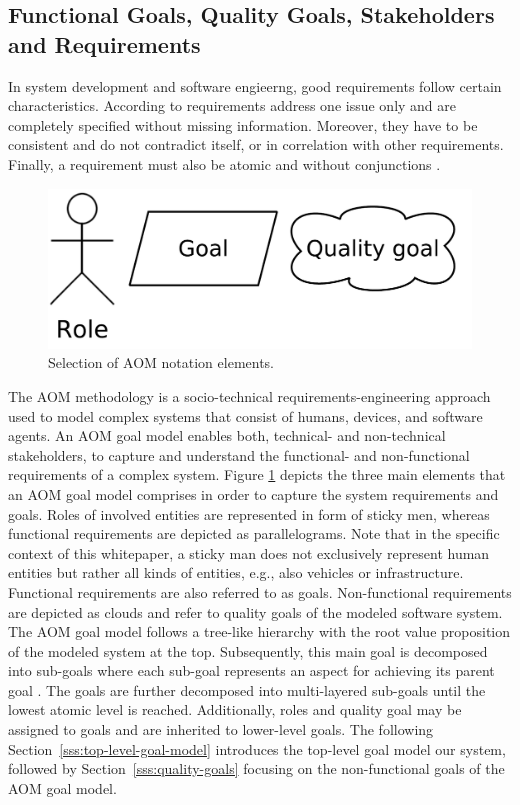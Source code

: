 \documentclass{llncs}
\begin{document}
{		\subsection{Functional Goals, Quality Goals, Stakeholders and Requirements}
			\label{ss:requirement-engineering}
						
			In system development and software engieerng, good requirements follow certain characteristics. According to \cite{davis1993software}\cite{ieee1994ieee} requirements address one issue only and are completely specified without missing information. Moreover, they have to be consistent and do not contradict itself, or in correlation with other requirements. Finally, a requirement must also be atomic and without conjunctions \cite{norta2014reference}.

			\begin{figure}[H]
				\centering
				\includegraphics[scale=0.2]{Figures/20180426_AOM-notation.pdf}
				\caption{Selection of AOM notation elements.}	
				\label{fig:aom-notaion-elements}
			\end{figure}				
			The AOM methodology is a socio-technical requirements-engineering approach used to model complex systems that consist of humans, devices, and software agents. An AOM goal model enables both, technical- and non-technical stakeholders, to capture and understand the functional- and non-functional requirements of a complex system. Figure \ref{fig:aom-notaion-elements} depicts the three main elements that an AOM goal model comprises in order to capture the system requirements and goals. Roles of involved entities are represented in form of sticky men, whereas functional requirements are depicted as parallelograms. Note that in the specific context of this whitepaper, a sticky man does not exclusively represent human entities but rather all kinds of entities, e.g., also vehicles or infrastructure. Functional requirements are also referred to as goals. Non-functional requirements are depicted as clouds and refer to quality goals of the modeled software system. The AOM goal model follows a tree-like hierarchy with the root value proposition of the modeled system at the top. Subsequently, this main goal is decomposed into sub-goals where each sub-goal represents an aspect for achieving its parent goal \cite{marshall2014agent}. The goals are further decomposed into multi-layered sub-goals until the lowest atomic level is reached. Additionally, roles and quality goal may be assigned to goals and are inherited to lower-level goals. The following Section~\ref{sss:top-level-goal-model} introduces the top-level goal model our system, followed by Section~\ref{sss:quality-goals} focusing on the non-functional goals of the AOM goal model.

}
\end{document}
